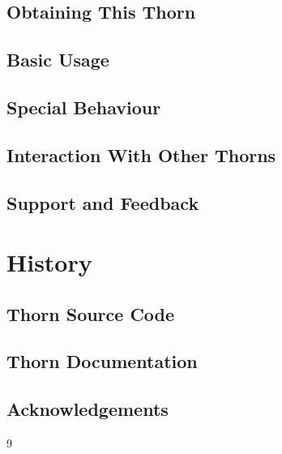 \subsection{Obtaining This Thorn}

\subsection{Basic Usage}

\subsection{Special Behaviour}

\subsection{Interaction With Other Thorns}

\subsection{Support and Feedback}

\section{History}

\subsection{Thorn Source Code}

\subsection{Thorn Documentation}

\subsection{Acknowledgements}


\begin{thebibliography}{9}

\end{thebibliography}



